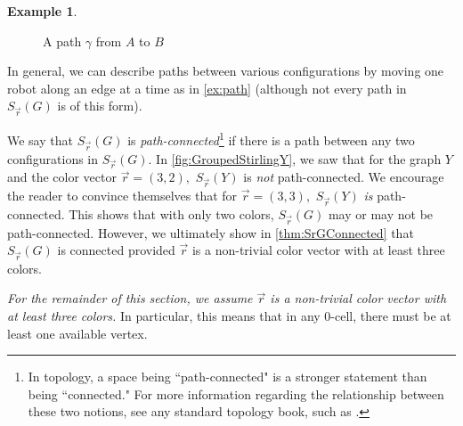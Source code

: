 \documentclass{amsart}
\newcommand{\quaad}{\quad\quad}
\newcommand{\Sr}{S_{\vec{r}}}
\newcommand{\vertex}[3][1]{
\node [circle,  fill, inner sep = 0pt,outer sep = 0pt, minimum size=#1mm] (#3) at #2 {};
}
\newcommand{\fg}[1]{
    \pgfdeclarelayer{foreground}
    \pgfsetlayers{main,foreground}
    \begin{pgfonlayer}{foreground}
    #1
    \end{pgfonlayer}
    }
\newcommand{\RedRobot}[2]{
\node [rectangle, cbred, fill, inner sep = 0pt,outer sep = 1pt, minimum size=2.3mm] (#2) at #1 {};
}
\newcommand{\GreenRobot}[2]{
\node [diamond, cbgreen, fill, inner sep = 0pt,outer sep = 1pt,minimum size=3mm] (#2) at #1 {};
}
\newcommand{\BlueRobot}[2]{
\node [isosceles triangle, shape border rotate=90,cbblue, fill, inner sep = 0pt,outer sep = 1pt,minimum size=2.5mm] (#2) at #1 {};
}
\theoremstyle{definition}
\newtheorem{ex}[thm]{Example}
\theoremstyle{remark}
\begin{document}
\begin{ex}
\begin{figure}[h!]
    \quaad
    \caption{A path $\gamma$ from $A$ to $B$}
    \label{fig:path}
\end{figure}
\end{ex}

In general, we can describe paths between various configurations by moving one robot along an edge at a time as in \cref{ex:path} (although not every path in $\Sr(G)$ is of this form).

We say that $\Sr(G)$ is \textit{path-connected}\footnote{In topology, a space being ``path-connected" is a stronger statement than being ``connected." For more information regarding the relationship between these two notions, see any standard topology book, such as \cite{Munkres_2000}.} if there is a path between any two configurations in $\Sr(G)$. In \cref{fig:GroupedStirlingY}, we saw that for the graph $Y$ and the color vector $\vec r = (3,2),$ $\Sr(Y)$ is \textit{not} path-connected. We encourage the reader to convince themselves that for $\vec r =(3,3),$ $\Sr(Y)$ \textit{is} path-connected. This shows that with only two colors, $\Sr(G)$ may or may not be path-connected. However, we ultimately show in \cref{thm:SrGConnected} that $\Sr(G)$ is connected provided $\vec{r}$ is a non-trivial color vector with at least three colors.

\textit{For the remainder of this section, we assume $\vec r$ is a non-trivial color vector with at least three colors.} In particular, this means that in any 0-cell, there must be at least one available vertex.
\end{document}
